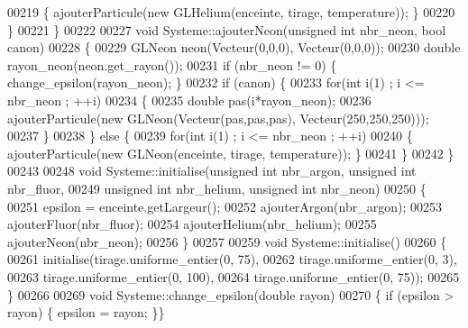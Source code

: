 \begin{DoxyCode}
00219         \{ ajouterParticule(\textcolor{keyword}{new} GLHelium(enceinte, tirage, temperature)); \}
00220     \}
00221 \}
00222 
00227 \textcolor{keywordtype}{void} Systeme::ajouterNeon(\textcolor{keywordtype}{unsigned} \textcolor{keywordtype}{int} nbr\_neon, \textcolor{keywordtype}{bool} canon)
00228 \{
00229     GLNeon neon(Vecteur(0,0,0), Vecteur(0,0,0));
00230     \textcolor{keywordtype}{double} rayon\_neon(neon.get_rayon());
00231     \textcolor{keywordflow}{if} (nbr\_neon != 0) \{ change\_epsilon(rayon\_neon); \}
00232     \textcolor{keywordflow}{if} (canon) \{
00233         \textcolor{keywordflow}{for}(\textcolor{keywordtype}{int} i(1) ; i <= nbr\_neon ; ++i)
00234         \{
00235             \textcolor{keywordtype}{double} pas(i*rayon\_neon);
00236             ajouterParticule(\textcolor{keyword}{new} GLNeon(Vecteur(pas,pas,pas), Vecteur(250,250,250)));
00237         \}
00238     \} \textcolor{keywordflow}{else} \{
00239         \textcolor{keywordflow}{for}(\textcolor{keywordtype}{int} i(1) ; i <= nbr\_neon ; ++i)
00240         \{ ajouterParticule(\textcolor{keyword}{new} GLNeon(enceinte, tirage, temperature)); \}
00241     \}
00242 \}
00243 
00248 \textcolor{keywordtype}{void} Systeme::initialise(\textcolor{keywordtype}{unsigned} \textcolor{keywordtype}{int} nbr\_argon, \textcolor{keywordtype}{unsigned} \textcolor{keywordtype}{int} nbr\_fluor,
00249                          \textcolor{keywordtype}{unsigned} \textcolor{keywordtype}{int} nbr\_helium, \textcolor{keywordtype}{unsigned} \textcolor{keywordtype}{int} nbr\_neon)
00250 \{
00251     epsilon = enceinte.getLargeur();
00252     ajouterArgon(nbr\_argon);
00253     ajouterFluor(nbr\_fluor);
00254     ajouterHelium(nbr\_helium);
00255     ajouterNeon(nbr\_neon);
00256 \}
00257 
00259 \textcolor{keywordtype}{void} Systeme::initialise()
00260 \{
00261     initialise(tirage.uniforme_entier(0, 75),
00262                tirage.uniforme_entier(0, 3),
00263                tirage.uniforme_entier(0, 100),
00264                tirage.uniforme_entier(0, 75)); 
00265 \}
00266 
00269 \textcolor{keywordtype}{void} Systeme::change\_epsilon(\textcolor{keywordtype}{double} rayon)
00270 \{ \textcolor{keywordflow}{if} (epsilon > rayon) \{ epsilon = rayon; \}\}
\end{DoxyCode}
